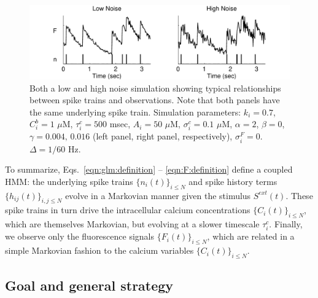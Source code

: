 \documentclass[aoas,preprint]{imsart}
\begin{document}
\begin{figure}
\centering
\includegraphics[width=\hsize]{../figs/sim_examples}
\caption{Both a low and high noise simulation showing typical relationships between spike trains and observations. Note that both panels have the same underlying spike train. Simulation parameters: $k_i=0.7$, $C_i^b=1$ $\mu$M, $\tau^c_i=500$ msec, $A_i=50$ $\mu$M, $\sigma^c_i=0.1$ $\mu$M,  $\alpha=2$, $\beta=0$, $\gamma=0.004, \, 0.016$ (left panel, right panel, respectively), $\sigma^F_i=0$.  $\Delta=1/60$ Hz.}
\label{fig:example_traces}
\end{figure}

To summarize, Eqs.~\eqref{eqn:glm:definition} -- \eqref{eqn:F:definition} define a coupled HMM: the underlying spike trains $\{n_i(t)\}_{i\leq N}$ and spike history terms $\{h_{ij}(t)\}_{i,j\leq N}$ evolve in a Markovian manner given the stimulus $S^{ext}(t)$. These spike trains in turn drive the intracellular calcium concentrations $\{C_i(t)\}_{i\leq N}$, which are themselves Markovian, but evolving at a slower timescale $\tau_i^c$. Finally, we observe only the fluorescence signals $\{F_i(t)\}_{i\leq N}$, which are related in a simple Markovian fashion to the calcium variables $\{C_i(t)\}_{i\leq N}$.

\subsection{Goal and general strategy}  \label{sec:methods:goal}
\end{document}
